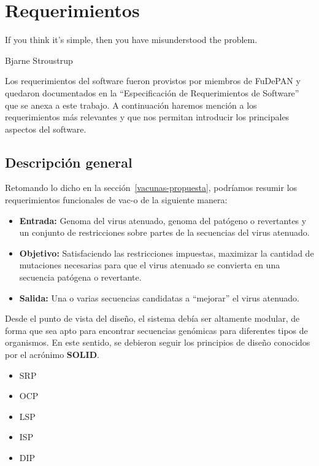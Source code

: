 \chapter{Requerimientos}
\epigraph{If you think it's simple, then you have misunderstood the problem.}%
{Bjarne Stroustrup}

Los requerimientos del software fueron provistos por miembros de \ac{FuDePAN} y
quedaron documentados en la ``Especificaci\'on de Requerimientos de Software''
que se anexa a este trabajo. A continuaci\'on haremos menci\'on a los
requerimientos m\'as relevantes y que nos permitan introducir los principales
aspectos del software.

\section{Descripci\'on general}

Retomando lo dicho en la secci\'on~\ref{vacunas-propuesta}, podr\'iamos
resumir los requerimientos funcionales de \ac{vac-o} de la siguiente manera:

\begin{itemize}
 \item \textbf{Entrada:} Genoma del virus atenuado, genoma del pat\'ogeno o
revertantes y un conjunto de restricciones sobre partes de la secuencias del
virus atenuado.
 \item \textbf{Objetivo:} Satisfaciendo las restricciones impuestas, maximizar
la cantidad de mutaciones necesarias para que el virus atenuado se convierta en
una secuencia pat\'ogena o revertante.
 \item \textbf{Salida:} Una o varias secuencias candidatas a ``mejorar'' el
virus atenuado.
\end{itemize}

Desde el punto de vista del dise\~no, el sistema deb\'ia ser altamente modular,
de forma que sea apto para encontrar secuencias gen\'omicas para diferentes
tipos de organismos. En este sentido, se debieron seguir los principios de
dise\~no conocidos por el acr\'onimo \textbf{SOLID}\cite{Martin00}.

\begin{itemize}
  \item \ac{SRP}
  \item \ac{OCP}
  \item \ac{LSP}
  \item \ac{ISP}
  \item \ac{DIP}
\end{itemize}


